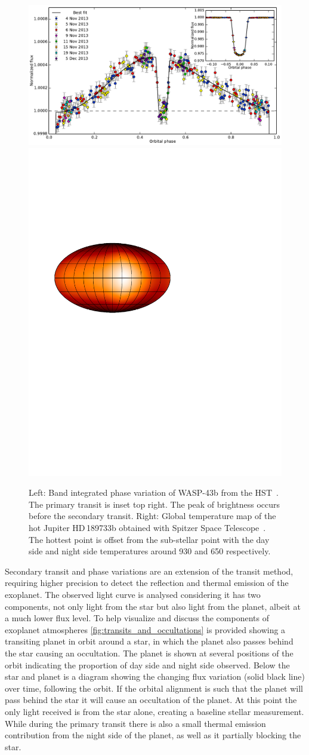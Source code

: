 \begin{figure}
    \centering
    \includegraphics[width=0.5\linewidth]{figures/introduction/stevenson_phasecurve2014.pdf}
    \includegraphics[width=0.4\linewidth]{figures/introduction/knutson_2007_temperature_map_HD_189733b.pdf}
    \caption{Left: Band integrated phase variation of {WASP-43b} from the HST~\citep{stevenson_thermal_2014}.
        The primary transit is inset top right.
        The peak of brightness occurs before the secondary transit.
        Right: Global temperature map of the hot Jupiter HD\,189733b obtained with {Spitzer Space Telescope}~\citep{knutson_map_2007}.
        The hottest point is offset from the sub-stellar point with the day side and night side temperatures around 930\K{} and 650\K{} respectively.}
    \label{fig:phasecurve2014_and_temp_map}
\end{figure}

Secondary transit and phase variations are an extension of the transit method, requiring higher precision to detect the reflection and thermal emission of the exoplanet.
The observed light curve is analysed considering it has two components, not only light from the star but also light from the planet, albeit at a much lower flux level.
To help visualize and discuss the components of exoplanet atmospheres \cref{fig:transits_and_occultations} is provided showing a transiting planet in orbit around a star, in which the planet also passes behind the star causing an occultation.
The planet is shown at several positions of the orbit indicating the proportion of day side and night side observed.
Below the star and planet is a diagram showing the changing flux variation (solid black line) over time, following the orbit.
If the orbital alignment is such that the planet will pass behind the star it will cause an occultation of the planet.
At this point the only light received is from the star alone, creating a baseline stellar measurement.
While during the primary transit there is also a small thermal emission contribution from the night side of the planet, as well as it partially blocking the star.

